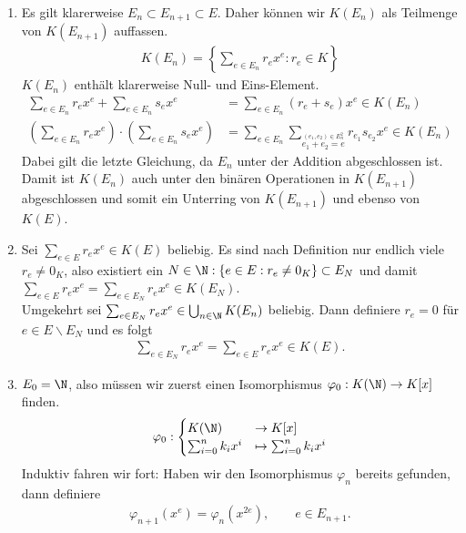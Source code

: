 \begin{solution}
\leavevmode \\
\begin{enumerate}
  \item Es gilt klarerweise $E_n \subset E_{n+1} \subset E$. Daher können wir $K(E_n)$
  als Teilmenge von $K(E_{n+1})$ auffassen.
  \begin{align*}
    K(E_n) = \left\{\sum_{e \in E_n}r_ex^e: r_e \in K\right\}
  \end{align*}
  $K(E_n)$ enthält klarerweise Null- und Eins-Element.
  \begin{align*}
    \sum_{e \in E_n}r_ex^e + \sum_{e \in E_n}s_ex^e &= \sum_{e \in E_n}(r_e + s_e)x^e \in K(E_n) \\
    \left(\sum_{e \in E_n}r_ex^e\right)\cdot\left(\sum_{e \in E_n}s_ex^e\right) &=
    \sum_{e \in E_n}\sum_{\stackrel{(e_1,e_2) \in E_n^2}{e_1 + e_2 = e}}r_{e_1}s_{e_2}x^e \in K(E_n)
  \end{align*}
  Dabei gilt die letzte Gleichung, da $E_n$ unter der Addition abgeschlossen ist.
  Damit ist $K(E_n)$ auch unter den binären Operationen in $K(E_{n+1})$
  abgeschlossen und somit ein Unterring von $K(E_{n+1})$ und ebenso von $K(E)$.
  \item
  Sei $\sum_{e \in E}r_ex^e \in K(E)$ beliebig. Es sind nach Definition nur endlich
  viele $r_e \neq 0_K$, also existiert ein $N \in \N: \{e \in E: r_e \neq 0_K\} \subset E_N$
  und damit $\sum_{e \in E}r_ex^e = \sum_{e \in E_N}r_ex^e \in K(E_N)$. \\
  Umgekehrt sei $\sum_{e \in E_N}r_ex^e \in \bigcup_{n \in \N}K(E_n)$ beliebig.
  Dann definiere $r_e = 0$ für $e \in E\backslash E_N$ und es folgt
  \begin{align*}
    \sum_{e \in E_N}r_ex^e = \sum_{e \in E}r_ex^e \in K(E).
  \end{align*}
  \item $E_0 = \N$, also müssen wir zuerst einen Isomorphismus $\varphi_0: K(\N) \to K[x]$
  finden.
  \begin{align*}
    \varphi_0: \begin{cases}
      K(\N) &\to K[x] \\
      \sum_{i = 0}^nk_ix^i &\mapsto \sum_{i = 0}^nk_ix^i
    \end{cases}
  \end{align*}
  Induktiv fahren wir fort: Haben wir den Isomorphismus $\varphi_n$ bereits gefunden,
  dann definiere
  \begin{align*}
    \varphi_{n+1}(x^e) = \varphi_n(x^{2e}), \qquad e \in E_{n+1}.

\end{align*}
\end{enumerate}
\end{solution}
